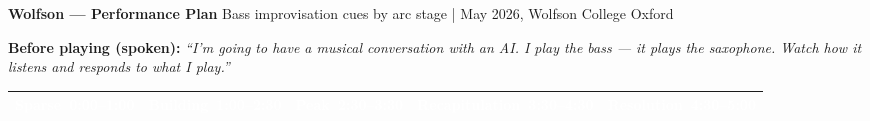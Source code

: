 \documentclass[9pt,a4paper,landscape]{article}
\begin{document}
\begin{center}
  {\large\bfseries Wolfson — Performance Plan}\quad
  {\small Bass improvisation cues by arc stage \;| May 2026, Wolfson College Oxford}
\end{center}

\enlargethispage{120pt}
{\small\textbf{Before playing (spoken):} \textit{``I'm going to have a musical conversation with an AI\@. I play the bass — it plays the saxophone. Watch how it listens and responds to what I play.''}}
\vspace{2pt}

\begin{tabularx}{\linewidth}{@{}|X|X|X|X|X|@{}}

\cellcolor{sparse}\textcolor{white}{\textbf{Sparse}}~\newline\cellcolor{sparse}\textcolor{white}{\small 0:00–1:00} &
\cellcolor{building}\textcolor{white}{\textbf{Building}}~\newline\cellcolor{building}\textcolor{white}{\small 1:00–2:30} &
\cellcolor{peak}\textcolor{white}{\textbf{Peak}}~\newline\cellcolor{peak}\textcolor{white}{\small 2:30–3:30} &
\cellcolor{recap}\textcolor{white}{\textbf{Recapitulation}}~\newline\cellcolor{recap}\textcolor{white}{\small 3:30–4:30} &
\cellcolor{resolution}\textcolor{white}{\textbf{Resolution}}~\newline\cellcolor{resolution}\textcolor{white}{\small 4:30–5:00} \\

\hline


\end{tabularx}
\end{document}
